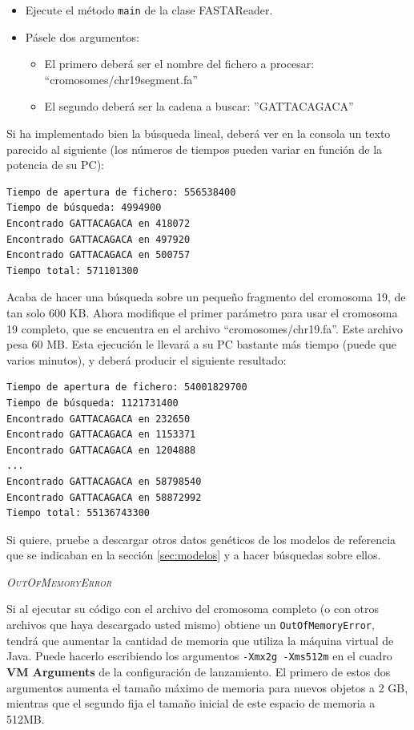 \documentclass[10pt,a4paper,spanish]{article}
\newcommand{\sombreado}[2]{
  \begin{shaded}
    \begin{center} \emph{\textsc{#1}} \end{center}
    \noindent #2\\
  \end{shaded}
}
\newcommand{\code}[1]{\texttt{#1}}
\begin{document}
\begin{itemize}
    \item Ejecute el método \code{main} de la clase {FASTAReader}.
    \item Pásele dos argumentos:
    \begin{itemize}
        \item El primero deberá ser el nombre del fichero a procesar: ``cromosomes/chr19segment.fa''
        \item El segundo deberá ser la cadena a buscar: ''GATTACAGACA''
    \end{itemize}
\end{itemize}

Si ha implementado bien la búsqueda lineal, deberá ver en la consola un texto parecido al siguiente (los números de tiempos pueden variar en función de la potencia de su PC):

\begin{verbatim}
Tiempo de apertura de fichero: 556538400
Tiempo de búsqueda: 4994900
Encontrado GATTACAGACA en 418072
Encontrado GATTACAGACA en 497920
Encontrado GATTACAGACA en 500757
Tiempo total: 571101300
\end{verbatim}

Acaba de hacer una búsqueda sobre un pequeño fragmento del cromosoma 19, de tan solo 600 KB. Ahora modifique el primer parámetro para usar el cromosoma 19 completo, que se encuentra en el archivo ``cromosomes/chr19.fa''. Este archivo pesa 60 MB. Esta ejecución le llevará a su PC bastante más tiempo (puede que varios minutos), y deberá producir el siguiente resultado:

\begin{verbatim}
Tiempo de apertura de fichero: 54001829700
Tiempo de búsqueda: 1121731400
Encontrado GATTACAGACA en 232650
Encontrado GATTACAGACA en 1153371
Encontrado GATTACAGACA en 1204888
...
Encontrado GATTACAGACA en 58798540
Encontrado GATTACAGACA en 58872992
Tiempo total: 55136743300
\end{verbatim}

Si quiere, pruebe a descargar otros datos genéticos de los modelos de referencia que se indicaban en la sección \ref{sec:modelos} y a hacer búsquedas sobre ellos.

\sombreado{OutOfMemoryError}{Si al ejecutar su código con el archivo del cromosoma completo (o con otros archivos que haya descargado usted mismo) obtiene un \code{OutOfMemoryError}, tendrá que aumentar la cantidad de memoria que utiliza la máquina virtual de Java. Puede hacerlo escribiendo los argumentos \code{-Xmx2g -Xms512m} en el cuadro \textbf{VM Arguments} de la configuración de lanzamiento. El primero de estos dos argumentos aumenta el tamaño máximo de memoria para nuevos objetos a 2 GB, mientras que el segundo fija el tamaño inicial de este espacio de memoria a 512MB.}
\end{document}
